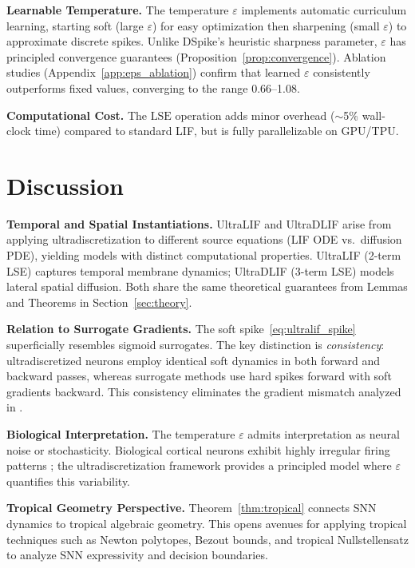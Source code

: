 \documentclass{article}
\theoremstyle{plain}
\theoremstyle{definition}
\theoremstyle{remark}
\newcommand{\lse}{\mathrm{LSE}}
\newcommand{\eps}{\varepsilon}
\begin{document}
\textbf{Learnable Temperature.} The temperature $\eps$ implements automatic curriculum learning, starting soft (large $\eps$) for easy optimization then sharpening (small $\eps$) to approximate discrete spikes. Unlike DSpike's heuristic sharpness parameter, $\eps$ has principled convergence guarantees (Proposition~\ref{prop:convergence}). Ablation studies (Appendix~\ref{app:eps_ablation}) confirm that learned $\eps$ consistently outperforms fixed values, converging to the range 0.66--1.08.

\textbf{Computational Cost.} The $\lse$ operation adds minor overhead ($\sim$5\% wall-clock time) compared to standard LIF, but is fully parallelizable on GPU/TPU.

\section{Discussion}
\label{sec:discussion}

\textbf{Temporal and Spatial Instantiations.} UltraLIF and UltraDLIF arise from applying ultradiscretization to different source equations (LIF ODE vs.\ diffusion PDE), yielding models with distinct computational properties. UltraLIF (2-term LSE) captures temporal membrane dynamics; UltraDLIF (3-term LSE) models lateral spatial diffusion. Both share the same theoretical guarantees from Lemmas and Theorems in Section~\ref{sec:theory}.

\textbf{Relation to Surrogate Gradients.} The soft spike~\eqref{eq:ultralif_spike} superficially resembles sigmoid surrogates. The key distinction is \emph{consistency}: ultradiscretized neurons employ identical soft dynamics in both forward and backward passes, whereas surrogate methods use hard spikes forward with soft gradients backward. This consistency eliminates the gradient mismatch analyzed in \citet{gygax2025elucidating}.

\textbf{Biological Interpretation.} The temperature $\eps$ admits interpretation as neural noise or stochasticity. Biological cortical neurons exhibit highly irregular firing patterns \citep{softky1993highly}; the ultradiscretization framework provides a principled model where $\eps$ quantifies this variability.

\textbf{Tropical Geometry Perspective.} Theorem~\ref{thm:tropical} connects SNN dynamics to tropical algebraic geometry. This opens avenues for applying tropical techniques such as Newton polytopes, Bezout bounds, and tropical Nullstellensatz to analyze SNN expressivity and decision boundaries.
\end{document}
